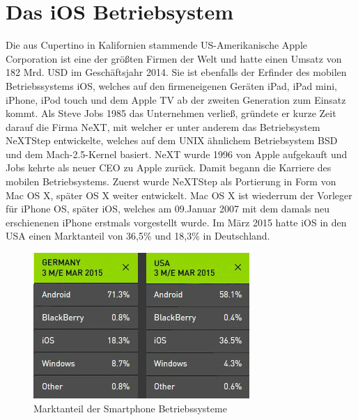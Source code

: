 \section{Das iOS Betriebsystem}
	Die aus Cupertino in Kalifornien stammende US-Amerikanische Apple Corporation
	ist eine der größten Firmen der Welt und hatte einen Umsatz von 182 Mrd.
	USD im Geschäftsjahr 2014. Sie ist ebenfalls der Erfinder des mobilen
	Betriebssystems iOS, welches auf den firmeneigenen Geräten iPad, iPad mini,
	iPhone, iPod touch und dem Apple TV ab der zweiten Generation zum Einsatz
	kommt. Als Steve Jobs 1985 das Unternehmen verließ, gründete er
	kurze Zeit darauf die Firma NeXT, mit welcher er unter anderem das
	Betriebsystem NeXTStep entwickelte, welches auf dem UNIX ähnlichem
	Betriebsystem BSD\cite[S.12]{Tanenbaum2009} und dem	Mach-2.5-Kernel
	\cite{MachProject2015}
	basiert. NeXT wurde 1996 von Apple aufgekauft und Jobs kehrte als neuer CEO zu
	Apple zurück. Damit begann die Karriere des mobilen Betriebsystems. Zuerst
	wurde NeXTStep als Portierung in Form von Mac OS X, später OS X weiter
	entwickelt. Mac OS X ist wiederrum der Vorleger für iPhone OS, später iOS,
	welches am 09.Januar 2007 mit dem damals neu erschienenen iPhone erstmals
	vorgestellt wurde. Im März 2015 hatte iOS in den USA einen Marktanteil von
	36,5\% und 18,3\% in Deutschland.\cite{MobileOsStat}\\
	
	\begin{figure}[h]
		\centering
		\includegraphics[width=0.5\linewidth]{ios/media/marketshare-cmp-201503.jpg}
		\caption{Marktanteil der Smartphone Betriebssysteme
		\cite{MobileOsStat}}
		\label{fig:marcetshare}
	\end{figure}